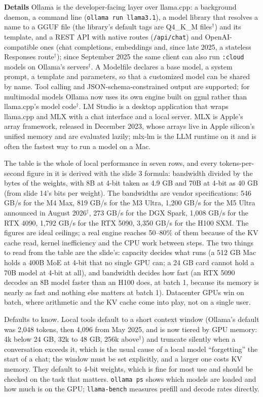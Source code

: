 \documentclass[11pt,letterpaper]{article}
\newcommand{\para}[1]{\medskip\noindent\textbf{#1}\quad}
\begin{document}
\para{Details} Ollama is the developer-facing layer over llama.cpp: a background daemon, a command line (\texttt{ollama run llama3.1}), a model library that resolves a name to a GGUF file (the library's default tags are Q4\_K\_M files$^\dagger$) and its template, and a REST API with native routes (\texttt{/api/chat}) and OpenAI-compatible ones (chat completions, embeddings and, since late 2025, a stateless Responses route$^\dagger$); since September 2025 the same client can also run \texttt{:cloud} models on Ollama's servers$^\dagger$. A Modelfile declares a base model, a system prompt, a template and parameters, so that a customized model can be shared by name. Tool calling and JSON-schema-constrained output are supported; for multimodal models Ollama now uses its own engine built on ggml rather than llama.cpp's model code$^\dagger$. LM Studio is a desktop application that wraps llama.cpp and MLX with a chat interface and a local server. MLX is Apple's array framework, released in December 2023, whose arrays live in Apple silicon's unified memory and are evaluated lazily; mlx-lm is the LLM runtime on it and is often the fastest way to run a model on a Mac.

The table is the whole of local performance in seven rows, and every tokens-per-second figure in it is derived with the slide 3 formula: bandwidth divided by the bytes of the weights, with 8B at 4-bit taken as 4.9 GB and 70B at 4-bit as 40 GB (from slide 14's bits per weight). The bandwidths are vendor specifications: 546 GB/s for the M4 Max, 819 GB/s for the M3 Ultra, 1,200 GB/s for the M5 Ultra announced in August 2026$^\dagger$, 273 GB/s for the DGX Spark, 1,008 GB/s for the RTX 4090, 1,792 GB/s for the RTX 5090, 3,350 GB/s for the H100 SXM. The figures are ideal ceilings; a real engine reaches 50--80\% of them because of the KV cache read, kernel inefficiency and the CPU work between steps. The two things to read from the table are the slide's: capacity decides what runs (a 512 GB Mac holds a 400B MoE at 4-bit that no single GPU can; a 24 GB card cannot hold a 70B model at 4-bit at all), and bandwidth decides how fast (an RTX 5090 decodes an 8B model faster than an H100 does, at batch 1, because its memory is nearly as fast and nothing else matters at batch 1). Datacenter GPUs win on batch, where arithmetic and the KV cache come into play, not on a single user.

Defaults to know. Local tools default to a short context window (Ollama's default was 2,048 tokens, then 4,096 from May 2025, and is now tiered by GPU memory: 4k below 24 GB, 32k to 48 GB, 256k above$^\dagger$) and truncate silently when a conversation exceeds it, which is the usual cause of a local model ``forgetting'' the start of a chat; the window must be set explicitly, and a larger one costs KV memory. They default to 4-bit weights, which is fine for most use and should be checked on the task that matters. \texttt{ollama ps} shows which models are loaded and how much is on the GPU; \texttt{llama-bench} measures prefill and decode rates directly.
\end{document}
